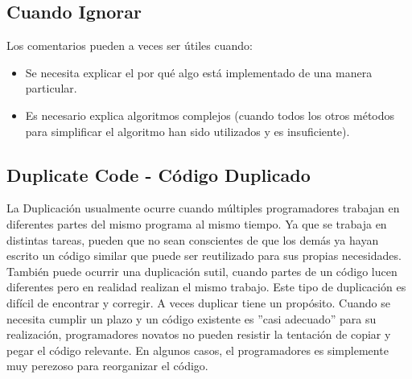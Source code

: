 \documentclass[11pt,a4paper,oneside]{book}
\begin{document}
\subsection{Cuando Ignorar}
Los comentarios pueden a veces ser útiles cuando:
\begin{itemize}
    \item Se necesita explicar el por qué algo está implementado de una manera particular.
    \item Es necesario explica algoritmos complejos (cuando todos los otros métodos para simplificar el algoritmo han sido utilizados y es insuficiente).
\end{itemize}
    
\subsection{Duplicate Code - Código Duplicado}
\label{duplicateCode}
La Duplicación usualmente ocurre cuando múltiples programadores trabajan en diferentes partes del mismo programa al mismo tiempo. Ya que se trabaja en distintas tareas, pueden que no sean conscientes de que los demás ya hayan escrito un código similar que puede ser reutilizado para sus propias necesidades.
\newline
También puede ocurrir una duplicación sutil, cuando partes de un código lucen diferentes pero en realidad realizan el mismo trabajo. Este tipo de duplicación es difícil de encontrar y corregir.
\newline
A veces duplicar tiene un propósito. Cuando se necesita cumplir un plazo y un código existente es ''casi adecuado'' para su realización, programadores novatos no pueden resistir la tentación de copiar y pegar el código relevante. En algunos casos, el programadores es simplemente muy perezoso para reorganizar el código.
\end{document}
